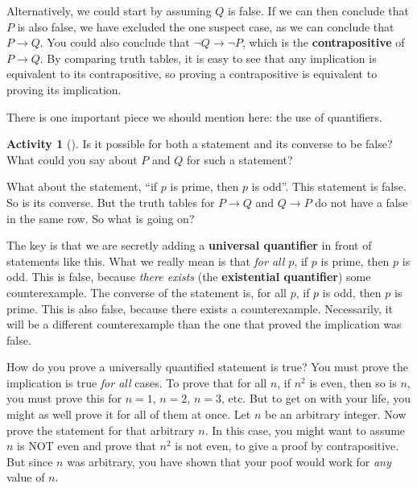 \documentclass[10pt,]{book}
\newcommand{\terminology}[1]{\textbf{#1}}
\theoremstyle{plain}
\theoremstyle{definition}
\theoremstyle{definition}
\theoremstyle{definition}
\newtheorem{activity}[project]{Activity}
\numberwithin{equation}{chapter}
\def\imp{\rightarrow}
\begin{document}
\hypertarget{p-1406}{}%
Alternatively, we could start by assuming \(Q\) is false.  If we can then conclude that \(P\) is also false, we have excluded the one suspect case, as we can conclude that \(P \imp Q\).  You could also conclude that \(\neg Q \imp \neg P\), which is the \terminology{contrapositive} of \(P \imp Q\).  By comparing truth tables, it is easy to see that any implication is equivalent to its contrapositive, so proving a contrapositive is equivalent to proving its implication.%
\par
\hypertarget{p-1407}{}%
There is one important piece we should mention here: the use of quantifiers.%
\begin{activity}[]\label{activity-274}
\hypertarget{p-1408}{}%
Is it possible for both a statement and its converse to be false?  What could you say about \(P\) and \(Q\) for such a statement?%
\end{activity}
\hypertarget{p-1409}{}%
What about the statement, ``if \(p\) is prime, then \(p\) is odd''.  This statement is false.  So is its converse.  But the truth tables for \(P \imp Q\) and \(Q \imp P\) do not have a false in the same row.  So what is going on?%
\par
\hypertarget{p-1410}{}%
The key is that we are secretly adding a \terminology{universal quantifier} in front of statements like this.  What we really mean is that \emph{for all \(p\)}, if \(p\) is prime, then \(p\) is odd.  This is false, because \emph{there exists} (the \terminology{existential quantifier}) some counterexample.  The converse of the statement is, for all \(p\), if \(p\) is odd, then \(p\) is prime.  This is also false, because there exists a counterexample.  Necessarily, it will be a different counterexample than the one that proved the implication was false.%
\par
\hypertarget{p-1411}{}%
How do you prove a universally quantified statement is true?  You must prove the implication is true \emph{for all} cases.  To prove that for all \(n\), if \(n^2\) is even, then so is \(n\), you must prove this for \(n = 1\), \(n = 2\), \(n =3\), etc.  But to get on with your life, you might as well prove it for all of them at once.  Let \(n\) be an arbitrary integer.  Now prove the statement for that arbitrary \(n\).  In this case, you might want to assume \(n\) is NOT even and prove that \(n^2\) is not even, to give a proof by contrapositive.  But since \(n\) was arbitrary, you have shown that your poof would work for \emph{any} value of \(n\).%
\typeout{************************************************}
\typeout{************************************************}
\end{document}
